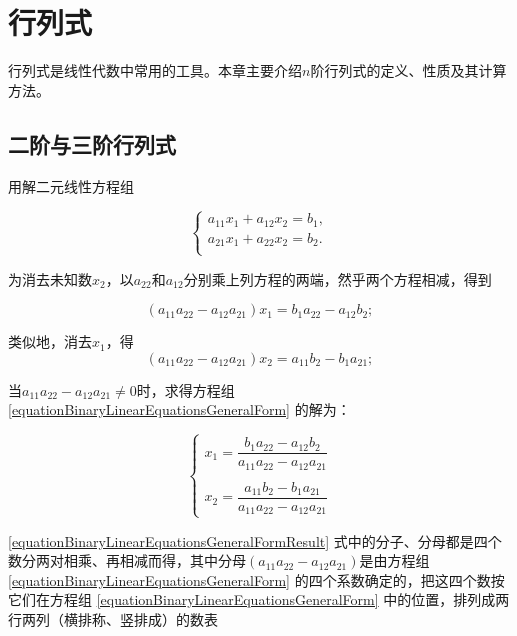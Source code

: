 \chapter{行列式}

行列式是线性代数中常用的工具。本章主要介绍$ n $阶行列式的定义、性质及其计算方法。

\section{二阶与三阶行列式}

用解二元线性方程组

\begin{equation} \label{equationBinaryLinearEquationsGeneralForm}
	\left\{
	\begin{array}{r}
		a_{11}x_1 + a_{12}x_2 = b_1, \\
		a_{21}x_1 + a_{22}x_2 = b_2. \\
	\end{array} \right.
\end{equation}

为消去未知数$ x_2 $，以$ a_{22} $和$ a_{12} $分别乘上列方程的两端，然乎两个方程相减，得到

\begin{equation}
	(a_{11}a_{22}-a_{12}a_{21})x_{1} = b_{1}a_{22}-a_{12}b_{2};
\end{equation}

类似地，消去$ x_1 $，得
\begin{equation}
	(a_{11}a_{22}-a_{12}a_{21})x_{2} = a_{11}b_{2}-b_{1}a_{21};
\end{equation}

当$ a_{11}a_{22}-a_{12}a_{21} \ne 0 $时，求得方程组 \ref{equationBinaryLinearEquationsGeneralForm} 的解为：

\begin{equation} \label{equationBinaryLinearEquationsGeneralFormResult}
	\left\{
	\begin{array}{r}
	x_{1} = \dfrac{b_{1}a_{22}-a_{12}b_{2}}{a_{11}a_{22}-a_{12}a_{21}} \\
	\\
	x_{2} = \dfrac{a_{11}b_{2}-b_{1}a_{21}}{a_{11}a_{22}-a_{12}a_{21}}
	
	\end{array} \right.
\end{equation}

\ref{equationBinaryLinearEquationsGeneralFormResult} 式中的分子、分母都是四个数分两对相乘、再相减而得，其中分母$ (a_{11}a_{22}-a_{12}a_{21}) $是由方程组 \ref{equationBinaryLinearEquationsGeneralForm} 的四个系数确定的，把这四个数按它们在方程组 \ref{equationBinaryLinearEquationsGeneralForm} 中的位置，排列成两行两列（横排称、竖排成）的数表

